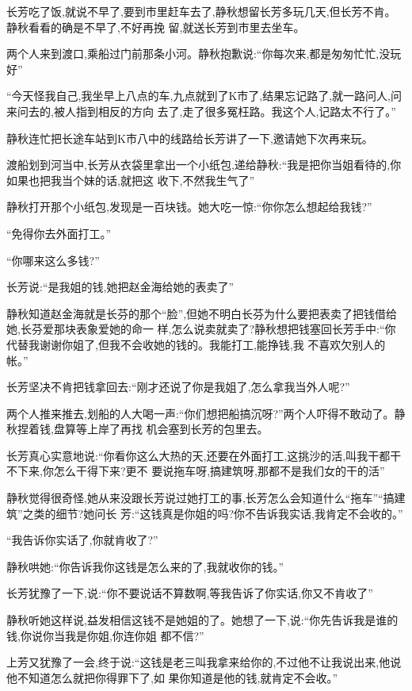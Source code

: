 ﻿\documentclass[12pt]{article}
\begin{document}
长芳吃了饭,就说不早了,要到市里赶车去了,静秋想留长芳多玩几天,但长芳不肯。静秋看看的确是不早了,不好再挽
留,就送长芳到市里去坐车。

两个人来到渡口,乘船过门前那条小河。静秋抱歉说:``你每次来,都是匆匆忙忙,没玩好\myrule ''

``今天怪我自己,我坐早上八点的车,九点就到了K市了,结果忘记路了,就一路问人,问来问去的,被人指到相反的方向
去了,走了很多冤枉路。我这个人,记路太不行了\myrule 。''

静秋连忙把长途车站到K市八中的线路给长芳讲了一下,邀请她下次再来玩。

渡船划到河当中,长芳从衣袋里拿出一个小纸包,递给静秋:``我是把你当姐看待的,你如果也把我当个妹的话,就把这
收下,不然我生气了\myrule ''

静秋打开那个小纸包,发现是一百块钱。她大吃一惊:``你\myrule 你怎么想起给我钱?''

``免得你去外面打工。''

``你哪来这么多钱?''

长芳说:``是我姐的钱,她把赵金海给她的表卖了\myrule ''


静秋知道赵金海就是长芬的那个``脸'',但她不明白长芬为什么要把表卖了把钱借给她,长芬爱那块表象爱她的命一
样,怎么说卖就卖了?静秋想把钱塞回长芳手中:``你代替我谢谢你姐了,但我不会收她的钱的。我能打工,能挣钱,我
不喜欢欠别人的帐。''

长芳坚决不肯把钱拿回去:``刚才还说了你是我姐了,怎么拿我当外人呢?''

两个人推来推去,划船的人大喝一声:``你们想把船搞沉呀?''两个人吓得不敢动了。静秋捏着钱,盘算等上岸了再找
机会塞到长芳的包里去。

长芳真心实意地说:``你看你这么大热的天,还要在外面打工,这挑沙的活,叫我干都干不下来,你怎么干得下来?更不
要说拖车呀,搞建筑呀,那都不是我们女的干的活\myrule ''

静秋觉得很奇怪,她从来没跟长芳说过她打工的事,长芳怎么会知道什么``拖车''``搞建筑''之类的细节?她问长
芳:``这钱真是你姐的吗?你不告诉我实话,我肯定不会收的。''

``我告诉你实话了,你就肯收了?''

静秋哄她:``你告诉我你这钱是怎么来的了,我就收你的钱。''

长芳犹豫了一下,说:``你不要说话不算数啊,等我告诉了你实话,你又不肯收了\myrule ''

静秋听她这样说,益发相信这钱不是她姐的了。她想了一下,说:``你先告诉我是谁的钱,你说你当我是你姐,你连你姐
都不信?''

上芳又犹豫了一会,终于说:``这钱是老三叫我拿来给你的,不过他不让我说出来,他说他不知道怎么就把你得罪下了,如
果你知道是他的钱,就肯定不会收\myrule 。''
\end{document}
